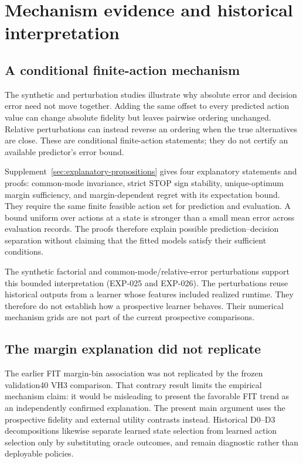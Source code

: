 \section{Mechanism evidence and historical interpretation}
\label{sec:mechanisms-history}

\subsection{A conditional finite-action mechanism}
The synthetic and perturbation studies illustrate why absolute error and
decision error need not move together. Adding the same offset to every
predicted action value can change absolute fidelity but leaves pairwise
ordering unchanged. Relative perturbations can instead reverse an ordering
when the true alternatives are close. These are conditional finite-action
statements; they do not certify an available predictor's error bound.

Supplement~\ref{sec:explanatory-propositions} gives four explanatory
statements and proofs: common-mode invariance, strict STOP sign stability,
unique-optimum margin sufficiency, and margin-dependent regret with its
expectation bound. They require the same finite feasible action set for
prediction and evaluation. A bound uniform over actions at a state is
stronger than a small mean error across evaluation records. The proofs
therefore explain possible prediction--decision separation without claiming
that the fitted models satisfy their sufficient conditions.

The synthetic factorial and common-mode/relative-error perturbations
support this bounded interpretation (EXP-025 and EXP-026). The perturbations
reuse historical outputs from a learner whose features included realized
runtime. They therefore do not establish how a prospective learner behaves.
Their numerical mechanism grids are not part of the current prospective
comparisons.

\subsection{The margin explanation did not replicate}
The earlier FIT margin-bin association was not replicated by the frozen
validation40 VH3 comparison. That contrary result limits the empirical
mechanism claim: it would be misleading to present the favorable FIT trend
as an independently confirmed explanation. The present main argument uses
the prospective fidelity and external utility contrasts instead. Historical
D0--D3 decompositions likewise separate learned state selection from learned
action selection only by substituting oracle outcomes, and remain diagnostic
rather than deployable policies.

